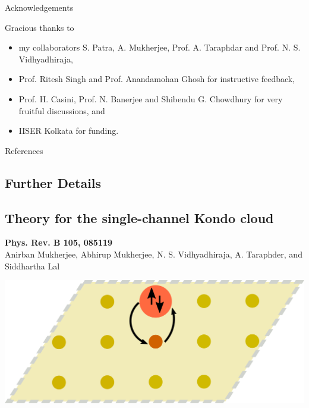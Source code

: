 \documentclass[8pt,aspectratio=169]{beamer}
\newcommand{\nitem}{\item[\ding{51}]}
\begin{document}
\begin{frame}{Acknowledgements}

\flushleft
Gracious thanks to\\[10pt]
\begin{itemize}
	\nitem my collaborators S. Patra, A. Mukherjee, Prof. A. Taraphdar and Prof. N. S. Vidhyadhiraja,
	\nitem Prof. Ritesh Singh and Prof. Anandamohan Ghosh for instructive feedback,
	\nitem Prof. H. Casini, Prof. N. Banerjee and Shibendu G. Chowdhury for very fruitful discussions, and
	\nitem IISER Kolkata for funding.
\end{itemize}

\end{frame}

\appendix

\begin{frame}[allowframebreaks]{References}
\printbibliography[heading=none]
\end{frame}

\begin{frame}{}
\section{Further Details}
\end{frame}

\begin{frame}{}
\section{Theory for the single-channel Kondo cloud}
\begin{minipage}{0.55\textwidth}
	\small{{\bf Phys. Rev. B 105, 085119}\\[10pt]
Anirban Mukherjee, \alert{Abhirup Mukherjee}, N. S. Vidhyadhiraja, A. Taraphder, and Siddhartha Lal}
\end{minipage}
\hspace*{\fill}
\begin{minipage}{0.4\textwidth}
	\includegraphics[width=\textwidth]{kondo-effect.pdf}
\end{minipage}
\end{frame}
\end{document}
